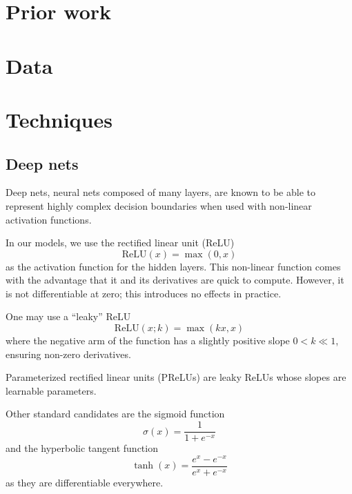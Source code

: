 \documentclass{article} %
\begin{document}
\section{Prior work} \label{section:litreview}


\section{Data} \label{section:data}

\section{Techniques} \label{section:techniques}
\subsection{Deep nets}
Deep nets, neural nets composed of many layers, are known to be able to represent highly complex decision boundaries when used with non-linear activation functions.

In our models, we use the rectified linear unit (ReLU) \cite{ICML:2010NairH10}
\[ \mathrm{ReLU}(x) = \max(0, x) \]
as the activation function for the hidden layers. This non-linear function comes with the advantage that it and its derivatives are quick to compute. However, it is not differentiable at zero; this introduces no effects in practice.

One may use a ``leaky'' ReLU
\[ \mathrm{ReLU}(x; k) = \max(kx, x) \]
where the negative arm of the function has a slightly positive slope $0 < k \ll 1$, ensuring non-zero derivatives.

Parameterized rectified linear units (PReLUs) \cite{DBLP:journals/corr/HeZR015} are leaky ReLUs whose slopes are learnable parameters.

Other standard candidates are the sigmoid function
\[ \sigma(x) = \frac{1}{1+e^{-x}} \]
and the hyperbolic tangent function
\[ \tanh(x) = \frac{e^x - e^{-x}}{e^x + e^{-x}} \]
as they are differentiable everywhere.
\end{document}
